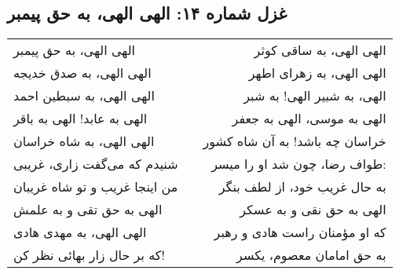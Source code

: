 \begin{center}
\section*{غزل شماره ۱۴: الهی الهی، به حق پیمبر}
\label{sec:014}
\begin{longtable}{l p{0.5cm} r}
الهی الهی، به حق پیمبر
&&
الهی الهی، به ساقی کوثر
\\
الهی الهی، به صدق خدیجه
&&
الهی الهی، به زهرای اطهر
\\
الهی الهی، به سبطین احمد
&&
الهی، به شبیر الهی! به شبر
\\
الهی به عابد! الهی به باقر
&&
الهی به موسی، الهی به جعفر
\\
الهی الهی، به شاه خراسان
&&
خراسان چه باشد! به آن شاه کشور
\\
شنیدم که می‌گفت زاری، غریبی
&&
طواف رضا، چون شد او را میسر:
\\
من اینجا غریب و تو شاه غریبان
&&
به حال غریب خود، از لطف بنگر
\\
الهی به حق تقی و به علمش
&&
الهی به حق نقی و به عسکر
\\
الهی الهی، به مهدی هادی
&&
که او مؤمنان راست هادی و رهبر
\\
که بر حال زار بهائی نظر کن!
&&
به حق امامان معصوم، یکسر
\\
\end{longtable}
\end{center}
